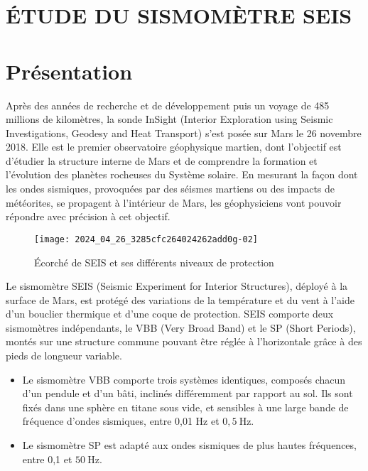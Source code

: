 

\section*{ÉTUDE DU SISMOMÈTRE SEIS}
\section{Présentation}
Après des années de recherche et de développement puis un voyage de 485 millions de kilomètres, la sonde InSight (Interior Exploration using Seismic Investigations, Geodesy and Heat Transport) s'est posée sur Mars le 26 novembre 2018. Elle est le premier observatoire géophysique martien, dont l'objectif est d'étudier la structure interne de Mars et de comprendre la formation et l'évolution des planètes rocheuses du Système solaire. En mesurant la façon dont les ondes sismiques, provoquées par des séismes martiens ou des impacts de météorites, se propagent à l'intérieur de Mars, les géophysiciens vont pouvoir répondre avec précision à cet objectif.


\begin{figure}[!h]
\centering
\texttt{[image: 2024\_04\_26\_3285cfc264024262add0g-02]}
\caption{\label{ccmp2023_fig_01}Écorché de SEIS et ses différents niveaux de protection}
\end{figure}




Le sismomètre SEIS (Seismic Experiment for Interior Structures), déployé à la surface de Mars, est protégé des variations de la température et du vent à l'aide d'un bouclier thermique et d'une coque de protection. SEIS comporte deux sismomètres indépendants, le VBB (Very Broad Band) et le SP (Short Periods), montés sur une structure commune pouvant être réglée à l'horizontale grâce à des pieds de longueur variable.

\begin{itemize}
  \item Le sismomètre VBB comporte trois systèmes identiques, composés chacun d'un pendule et d'un bâti, inclinés différemment par rapport au sol. Ils sont fixés dans une sphère en titane sous vide, et sensibles à une large bande de fréquence d'ondes sismiques, entre 0,01 Hz et $0,5 \mathrm{~Hz}$.
  \item Le sismomètre SP est adapté aux ondes sismiques de plus hautes fréquences, entre 0,1 et $50 \mathrm{~Hz}$.
\end{itemize}

